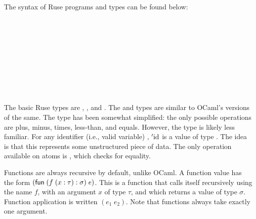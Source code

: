 \documentclass{homework}
\begin{document}
The syntax of Ruse programs and types can be found below:
\begin{syntax}
  \category[Types]{\tau, \sigma}
    \alternative{\int}
    \alternative{\bool}
    \alternative{\atom}
    \alternative{\lstty{\tau}}
    \alternative{\atomic{\id}}\\
    \\
    \\
    \alternative{\true}
    \alternative{\false}
    \\
    \\
    \\
    \\
    \alternative{\atomic{\id}}
    \alternative{\true}
    \alternative{\false}
    \\
\end{syntax}

The basic Ruse types are \int{}, \bool{}, and \atom.
The \int{} and \bool{} types are similar to OCaml's versions of the same.
The \int{} type has been somewhat simplified: the only possible operations are plus, minus, times, less-than, and equals.
However, the \atom{} type is likely less familiar.
For any identifier (i.e., valid variable) \id, ${}'\text{id}$ is a value of type \atom{}.
The idea is that this represents some unstructured piece of data.
The only operation available on atoms is \eq, which checks for equality.

Functions are always recursive by default, unlike OCaml.
A function value has the form $(\textsf{fun}\; (f\;(x : \tau) \mathrel{:} \sigma)\; e)$.
This is a function that calls itself recursively using the name $f$, with an argument $x$ of type $\tau$, and which returns a value of type $\sigma$.
Function application is written $(e_1\; e_2)$.
Note that functions always take exactly one argument.
\end{document}
